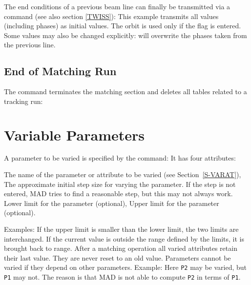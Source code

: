 The end conditions of a previous beam line can finally be transmitted
via a  command
(see also section \ref{TWISS}):
This example transmits all values (including phases) as initial
values.
The orbit is used only if the flag  is entered.
Some values may also be changed explicitly:
will overwrite the phases taken from the previous line.
\subsection{End of Matching Run}
The  command terminates the matching section
and deletes all tables related to a tracking run:
\section{Variable Parameters}
\label{S-VARY}
A parameter to be varied is specified by the  command:
It has four attributes:
\begin{mylist}
The name of the parameter or attribute to be varied
(see Section~\ref{S-VARAT}),
The approximate initial step size for varying the parameter.
If the step is not entered, MAD tries to find a reasonable step,
but this may not always work.
Lower limit for the parameter (optional),
Upper limit for the parameter (optional).
\end{mylist}
Examples:
If the upper limit is smaller than the lower limit,
the two limits are interchanged.
If the current value is outside the range defined by the limits,
it is brought back to range.
After a matching operation all varied attributes retain their last value.
They are never reset to an old value.
Parameters cannot be varied if they depend on other parameters.
Example:
Here {\tt P2} may be varied, but {\tt P1} may not.
The reason is that MAD is not able to compute {\tt P2}
in terms of {\tt P1}.
 

